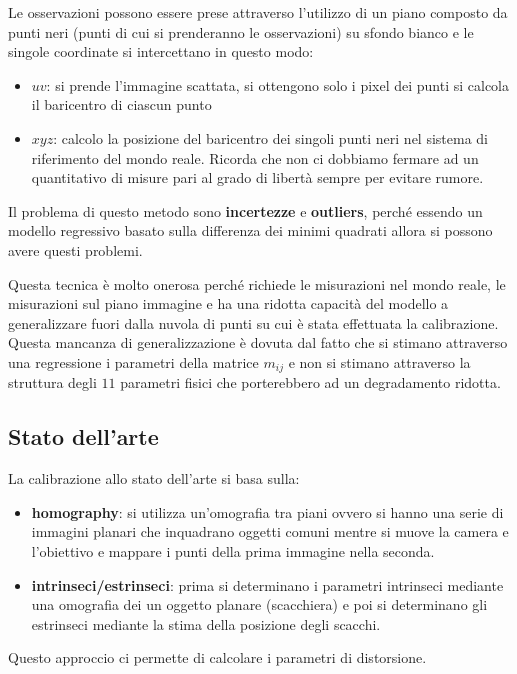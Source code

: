 Le osservazioni possono essere prese attraverso l'utilizzo di un piano composto 
da punti neri (punti di cui si prenderanno le osservazioni) su sfondo bianco e le singole coordinate si intercettano in questo modo:
\begin{itemize}
    \item $uv$: si prende l'immagine scattata, si ottengono solo i pixel dei punti 
    si calcola il baricentro di ciascun punto
    \item $xyz$: calcolo la posizione del baricentro dei singoli punti neri nel 
    sistema di riferimento del mondo reale. Ricorda che non ci dobbiamo fermare 
    ad un quantitativo di misure pari al grado di libertà sempre per evitare rumore.
\end{itemize}

Il problema di questo metodo sono \textbf{incertezze} e \textbf{outliers}, perché
essendo un modello regressivo basato sulla differenza dei minimi quadrati allora 
si possono avere questi problemi. 

Questa tecnica è molto onerosa perché richiede le misurazioni nel mondo reale, 
le misurazioni sul piano immagine e ha una ridotta capacità del modello a generalizzare 
fuori dalla nuvola di punti su cui è stata effettuata la calibrazione. Questa 
mancanza di generalizzazione è dovuta dal fatto che si stimano attraverso una regressione 
i parametri della matrice $m_{ij}$ e non si stimano attraverso la struttura degli 
$11$ parametri fisici che porterebbero ad un degradamento ridotta.


\subsection{Stato dell'arte}
La calibrazione allo stato dell'arte si basa sulla:
\begin{itemize}
    \item \textbf{homography}: si utilizza un'omografia tra piani ovvero si hanno 
    una serie di immagini planari che inquadrano oggetti comuni mentre si muove 
    la camera e l'obiettivo e mappare i punti della prima immagine nella seconda.
    \item \textbf{intrinseci/estrinseci}: prima si determinano i parametri intrinseci
    mediante una omografia dei un oggetto planare (scacchiera) e poi si determinano 
    gli estrinseci mediante la stima della posizione degli scacchi.
\end{itemize} 

Questo approccio ci permette di calcolare i parametri di distorsione.

